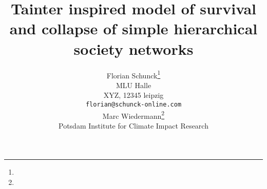 
\title{Tainter inspired model of survival and collapse of simple hierarchical society networks}


\author{
  Florian Schunck\thanks{} \\
  MLU Halle \\
  XYZ, 12345 leipzig \\
  \texttt{florian@schunck-online.com} \\
	\AND
  Marc Wiedermann\thanks{}\\
  Potsdam Institute for Climate Impact Research \\
 }
